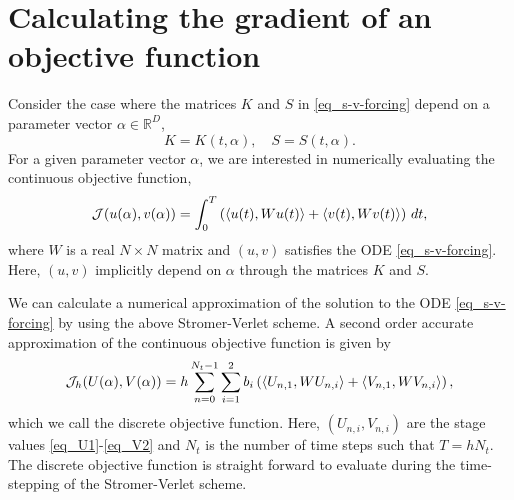 \documentclass[11pt]{article}
\begin{document}
\section{Calculating the gradient of an objective function}

Consider the case where the matrices $K$ and $S$ in \eqref{eq_s-v-forcing} depend on a parameter
vector $\alpha \in {\mathbb R}^D$,
\[
K = K(t,\alpha),\quad S = S(t,\alpha).
\]
For a given parameter vector $\alpha$, we are interested in numerically evaluating the continuous objective function,
\[
{\cal J}(u(\alpha), v(\alpha)) = \int_{0}^T \left( \langle u(t),W u(t) \rangle +  \langle v(t),W v(t) \rangle\right)\, dt,
\]
where $W$ is a real $N\times N$ matrix and $(u,v)$ satisfies the ODE \eqref{eq_s-v-forcing}. Here, $(u,v)$ implicitly depend on $\alpha$
through the matrices $K$ and $S$.

We can calculate a numerical approximation of the solution to the ODE \eqref{eq_s-v-forcing} by
using the above Stromer-Verlet scheme. A second order accurate approximation of the continuous
objective function is given by
\begin{equation}\label{eq_discrete_obj}
  {\cal J}_h(U(\alpha), V(\alpha)) = h \sum_{n=0}^{N_t-1} \sum_{i=1}^2 b_i \left( \langle U_{n,1}, W U_{n,i}\rangle +
  \langle V_{n,1}, W V_{n,i}\rangle \right),
\end{equation}
which we call the discrete objective function. Here, $(U_{n,i}, V_{n,i})$ are the stage values
\eqref{eq_U1}-\eqref{eq_V2} and $N_t$ is the number of time steps such that $T=h N_t$.
The discrete objective function is straight forward to evaluate during the time-stepping of the
Stromer-Verlet scheme.
\end{document}
